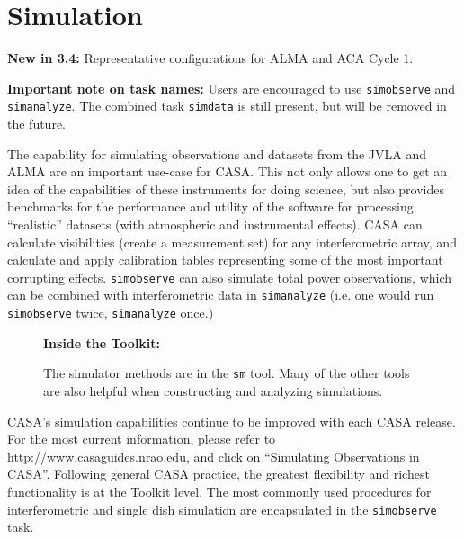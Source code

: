 
\chapter[Simulation]{Simulation}
\label{chapter:sim}

{\bfseries New in 3.4:} 
Representative configurations for ALMA and ACA Cycle 1.

{\bfseries Important note on task names:}
Users are encouraged to use {\tt simobserve} and {\tt simanalyze}.  The combined task {\tt simdata} is still present, but will be removed in the future.

The capability for simulating observations and datasets from the JVLA
and ALMA are an important use-case for CASA.  This not only allows one
to get an idea of the capabilities of these instruments for doing
science, but also provides benchmarks for the performance and utility
of the software for processing ``realistic'' datasets (with
atmospheric and instrumental effects).  CASA can calculate
visibilities (create a measurement set) for any interferometric array,
and calculate and apply calibration tables representing some of the
most important corrupting effects. {\tt simobserve} can also simulate
total power observations, which can be combined with interferometric
data in {\tt simanalyze} (i.e. one would run {\tt simobserve} twice,
{\tt simanalyze} once.)



\begin{wrapfigure}{r}{2.5in}
 \begin{boxedminipage}{2.5in}
    \centerline{\bf Inside the Toolkit:}
    The simulator methods are in the {\tt sm} tool.
    Many of the other tools are also helpful when
    constructing and analyzing simulations.
 \end{boxedminipage}
\end{wrapfigure}

CASA's simulation capabilities continue to be improved with each CASA release.
For the most current information, please refer to
\url{http://www.casaguides.nrao.edu}, and click on ``Simulating
Observations in CASA''.
%
Following general CASA practice, the greatest flexibility and richest
functionality is at the Toolkit level.  The most commonly used
procedures for interferometric and single dish simulation are
encapsulated in the {\tt simobserve} task.

